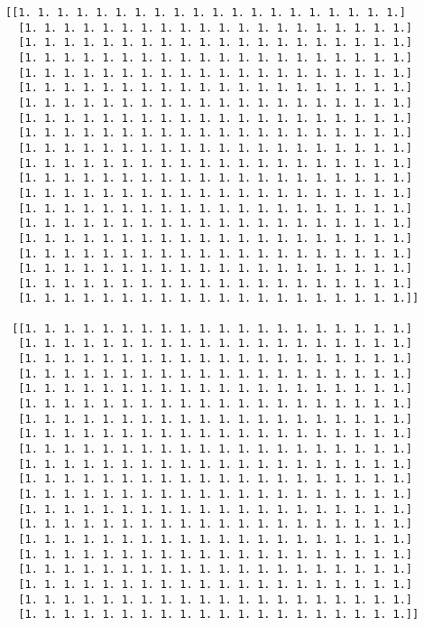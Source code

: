 \documentclass[11pt]{article}
\begin{document}
\begin{Verbatim}[commandchars=\\\{\}]
 [[1. 1. 1. 1. 1. 1. 1. 1. 1. 1. 1. 1. 1. 1. 1. 1. 1. 1. 1. 1.]
  [1. 1. 1. 1. 1. 1. 1. 1. 1. 1. 1. 1. 1. 1. 1. 1. 1. 1. 1. 1.]
  [1. 1. 1. 1. 1. 1. 1. 1. 1. 1. 1. 1. 1. 1. 1. 1. 1. 1. 1. 1.]
  [1. 1. 1. 1. 1. 1. 1. 1. 1. 1. 1. 1. 1. 1. 1. 1. 1. 1. 1. 1.]
  [1. 1. 1. 1. 1. 1. 1. 1. 1. 1. 1. 1. 1. 1. 1. 1. 1. 1. 1. 1.]
  [1. 1. 1. 1. 1. 1. 1. 1. 1. 1. 1. 1. 1. 1. 1. 1. 1. 1. 1. 1.]
  [1. 1. 1. 1. 1. 1. 1. 1. 1. 1. 1. 1. 1. 1. 1. 1. 1. 1. 1. 1.]
  [1. 1. 1. 1. 1. 1. 1. 1. 1. 1. 1. 1. 1. 1. 1. 1. 1. 1. 1. 1.]
  [1. 1. 1. 1. 1. 1. 1. 1. 1. 1. 1. 1. 1. 1. 1. 1. 1. 1. 1. 1.]
  [1. 1. 1. 1. 1. 1. 1. 1. 1. 1. 1. 1. 1. 1. 1. 1. 1. 1. 1. 1.]
  [1. 1. 1. 1. 1. 1. 1. 1. 1. 1. 1. 1. 1. 1. 1. 1. 1. 1. 1. 1.]
  [1. 1. 1. 1. 1. 1. 1. 1. 1. 1. 1. 1. 1. 1. 1. 1. 1. 1. 1. 1.]
  [1. 1. 1. 1. 1. 1. 1. 1. 1. 1. 1. 1. 1. 1. 1. 1. 1. 1. 1. 1.]
  [1. 1. 1. 1. 1. 1. 1. 1. 1. 1. 1. 1. 1. 1. 1. 1. 1. 1. 1. 1.]
  [1. 1. 1. 1. 1. 1. 1. 1. 1. 1. 1. 1. 1. 1. 1. 1. 1. 1. 1. 1.]
  [1. 1. 1. 1. 1. 1. 1. 1. 1. 1. 1. 1. 1. 1. 1. 1. 1. 1. 1. 1.]
  [1. 1. 1. 1. 1. 1. 1. 1. 1. 1. 1. 1. 1. 1. 1. 1. 1. 1. 1. 1.]
  [1. 1. 1. 1. 1. 1. 1. 1. 1. 1. 1. 1. 1. 1. 1. 1. 1. 1. 1. 1.]
  [1. 1. 1. 1. 1. 1. 1. 1. 1. 1. 1. 1. 1. 1. 1. 1. 1. 1. 1. 1.]
  [1. 1. 1. 1. 1. 1. 1. 1. 1. 1. 1. 1. 1. 1. 1. 1. 1. 1. 1. 1.]]

 [[1. 1. 1. 1. 1. 1. 1. 1. 1. 1. 1. 1. 1. 1. 1. 1. 1. 1. 1. 1.]
  [1. 1. 1. 1. 1. 1. 1. 1. 1. 1. 1. 1. 1. 1. 1. 1. 1. 1. 1. 1.]
  [1. 1. 1. 1. 1. 1. 1. 1. 1. 1. 1. 1. 1. 1. 1. 1. 1. 1. 1. 1.]
  [1. 1. 1. 1. 1. 1. 1. 1. 1. 1. 1. 1. 1. 1. 1. 1. 1. 1. 1. 1.]
  [1. 1. 1. 1. 1. 1. 1. 1. 1. 1. 1. 1. 1. 1. 1. 1. 1. 1. 1. 1.]
  [1. 1. 1. 1. 1. 1. 1. 1. 1. 1. 1. 1. 1. 1. 1. 1. 1. 1. 1. 1.]
  [1. 1. 1. 1. 1. 1. 1. 1. 1. 1. 1. 1. 1. 1. 1. 1. 1. 1. 1. 1.]
  [1. 1. 1. 1. 1. 1. 1. 1. 1. 1. 1. 1. 1. 1. 1. 1. 1. 1. 1. 1.]
  [1. 1. 1. 1. 1. 1. 1. 1. 1. 1. 1. 1. 1. 1. 1. 1. 1. 1. 1. 1.]
  [1. 1. 1. 1. 1. 1. 1. 1. 1. 1. 1. 1. 1. 1. 1. 1. 1. 1. 1. 1.]
  [1. 1. 1. 1. 1. 1. 1. 1. 1. 1. 1. 1. 1. 1. 1. 1. 1. 1. 1. 1.]
  [1. 1. 1. 1. 1. 1. 1. 1. 1. 1. 1. 1. 1. 1. 1. 1. 1. 1. 1. 1.]
  [1. 1. 1. 1. 1. 1. 1. 1. 1. 1. 1. 1. 1. 1. 1. 1. 1. 1. 1. 1.]
  [1. 1. 1. 1. 1. 1. 1. 1. 1. 1. 1. 1. 1. 1. 1. 1. 1. 1. 1. 1.]
  [1. 1. 1. 1. 1. 1. 1. 1. 1. 1. 1. 1. 1. 1. 1. 1. 1. 1. 1. 1.]
  [1. 1. 1. 1. 1. 1. 1. 1. 1. 1. 1. 1. 1. 1. 1. 1. 1. 1. 1. 1.]
  [1. 1. 1. 1. 1. 1. 1. 1. 1. 1. 1. 1. 1. 1. 1. 1. 1. 1. 1. 1.]
  [1. 1. 1. 1. 1. 1. 1. 1. 1. 1. 1. 1. 1. 1. 1. 1. 1. 1. 1. 1.]
  [1. 1. 1. 1. 1. 1. 1. 1. 1. 1. 1. 1. 1. 1. 1. 1. 1. 1. 1. 1.]
  [1. 1. 1. 1. 1. 1. 1. 1. 1. 1. 1. 1. 1. 1. 1. 1. 1. 1. 1. 1.]]


\end{Verbatim}
\end{document}
